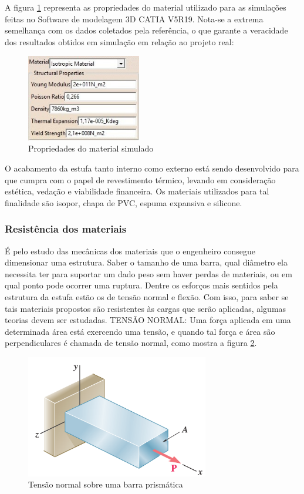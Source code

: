 A figura \ref{fig:propriedade_material} representa as propriedades do material utilizado para as simulações feitas no Software de modelagem 3D CATIA V5R19. Nota-se a extrema semelhança com os dados coletados pela referência, o que garante a veracidade dos resultados obtidos em simulação em relação ao projeto real:
\begin{figure}[H]
	\centering
	\includegraphics[width=5cm]{figuras/propriedade_material.jpg}
	\caption{Propriedades do material simulado}
	\label{fig:propriedade_material}
\end{figure}
O acabamento da estufa tanto interno como externo está sendo desenvolvido para que cumpra com o papel de revestimento térmico, levando em consideração estética, vedação e viabilidade financeira. Os materiais utilizados para tal finalidade são isopor, chapa de PVC, espuma expansiva e silicone.
\subsubsection{Resistência dos materiais}

É pelo estudo das mecânicas dos materiais que o engenheiro consegue dimensionar uma estrutura. Saber o tamanho de uma barra, qual diâmetro ela necessita ter para suportar um dado peso sem haver perdas de materiais, ou em qual ponto pode ocorrer uma ruptura. 
Dentre os esforços mais sentidos pela estrutura da estufa estão os de tensão normal e flexão. Com isso, para saber se tais materiais propostos são resistentes às cargas que serão aplicadas, algumas teorias devem ser estudadas.
TENSÃO NORMAL: Uma força aplicada em uma determinada área está exercendo uma tensão, e quando tal força e área são perpendiculares é chamada de tensão normal, como mostra a figura \ref{fig:tensao_normal}. 
\begin{figure}[H]
	\centering
	\includegraphics[width=8cm]{figuras/tensao_normal.png}
	\caption{Tensão normal sobre uma barra prismática}
	\label{fig:tensao_normal}
\end{figure}


